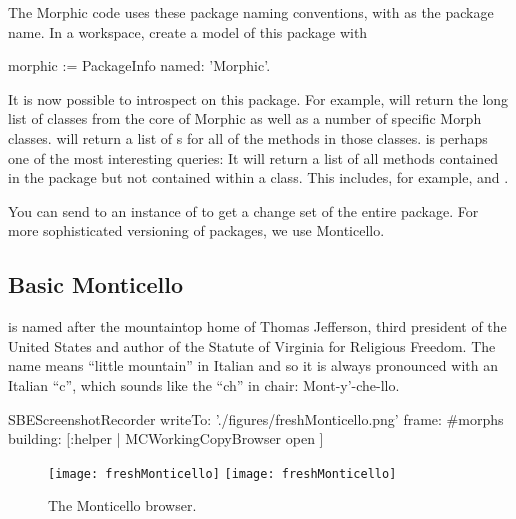 \documentclass[a4paper,10pt,twoside]{book}
\begin{document}

The Morphic code uses these package naming conventions, with  as the package name.
In a workspace, create a model of this package with

\begin{code}{}
morphic := PackageInfo named: 'Morphic'.
\end{code}

It is now possible to introspect on this package.
For example,  will return the long list of classes from the core of Morphic as well as a number of specific Morph classes.
 will return a list of s for all of the methods in those classes.
 is perhaps one of the most interesting queries:
It will return a list of all methods contained in the  package but not contained within a  class.
This includes, for example,  and .


You can send  to an instance of  to get a change set of the entire package.
For more sophisticated versioning of packages, we use Monticello.

\subsection{Basic Monticello}

 is named after the mountaintop home of Thomas Jefferson, third president of the United States and author of the Statute of Virginia for Religious Freedom.
The name means ``little mountain'' in Italian and so it is always pronounced with an Italian ``c'', which sounds like the ``ch'' in chair: Mont-y'-che-llo.


\begin{ExecuteSmalltalkScript}
SBEScreenshotRecorder writeTo: './figures/freshMonticello.png' frame: #morphs building: [:helper |
  MCWorkingCopyBrowser open
]
\end{ExecuteSmalltalkScript}
\begin{figure}[btp]
	\begin{center}
	\ifluluelse
		{\texttt{[image: freshMonticello]}}
		{\texttt{[image: freshMonticello]}}
	\end{center}
	\caption{The Monticello browser.}
	\label{fig:freshMonticello}
\end{figure}
\end{document}
